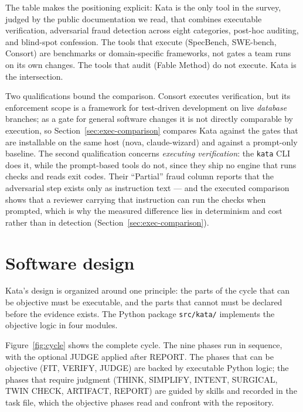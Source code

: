 \documentclass{sbc2019}%
\begin{document}
The table makes the positioning explicit: Kata is the only tool in the
survey, judged by the public documentation we read, that combines executable verification, adversarial fraud detection
across eight categories, post-hoc auditing, and blind-spot confession.
The tools that execute (SpecBench, SWE-bench, Consort) are benchmarks or
domain-specific frameworks, not gates a team runs on its own changes. The
tools that audit (Fable Method) do not execute. Kata is the intersection.

Two qualifications bound the comparison. Consort \cite{consort} executes
verification, but its enforcement scope is a framework for test-driven
development on live \emph{database} branches; as a gate for general software
changes it is not directly comparable by execution, so Section~\ref{sec:exec-comparison}
compares Kata against the gates that are installable on the same host
(nova, claude-wizard) and against a prompt-only baseline. The second
qualification concerns \emph{executing verification}: the \texttt{kata} CLI
does it, while the prompt-based tools do not, since they ship no engine that
runs checks and reads exit codes. Their ``Partial'' fraud column
reports that the adversarial step exists only as instruction text --- and
the executed comparison shows that a reviewer carrying that instruction can
run the checks when prompted, which is why the measured difference lies in
determinism and cost rather than in detection
(Section~\ref{sec:exec-comparison}).

\section{Software design}
\label{sec:design}

Kata's design is organized around one principle: the parts of the cycle that
can be objective must be executable, and the parts that cannot must be
declared before the evidence exists. The Python package \texttt{src/kata/}
implements the objective logic in four modules.

Figure~\ref{fig:cycle} shows the complete cycle. The nine phases run in
sequence, with the optional JUDGE applied after REPORT. The phases that
can be objective (FIT, VERIFY, JUDGE) are backed by executable Python
logic; the phases that require judgment (THINK, SIMPLIFY, INTENT,
SURGICAL, TWIN CHECK, ARTIFACT, REPORT) are guided by skills and recorded
in the task file, which the objective phases read and confront with the
repository.
\end{document}
